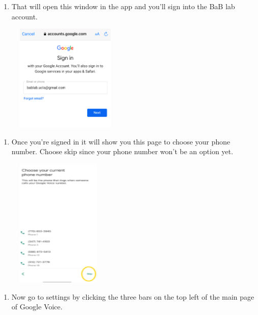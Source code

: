 \documentclass[]{book}
\providecommand{\tightlist}{%
  \setlength{\itemsep}{0pt}\setlength{\parskip}{0pt}}
\begin{document}
\begin{enumerate}
\def\labelenumi{\arabic{enumi})}
\setcounter{enumi}{2}
\tightlist
\item
  That will open this window in the app and you'll sign into the BaB lab
  account.
\end{enumerate}

\begin{figure}
\centering
\includegraphics{images/research_protocols/google_voice/pic3.png}
\caption{}
\end{figure}

\begin{enumerate}
\def\labelenumi{\arabic{enumi})}
\setcounter{enumi}{3}
\tightlist
\item
  Once you're signed in it will show you this page to choose your phone
  number. Choose skip since your phone number won't be an option yet.
\end{enumerate}

\begin{figure}
\centering
\includegraphics{images/research_protocols/google_voice/pic4.png}
\caption{}
\end{figure}

\begin{enumerate}
\def\labelenumi{\arabic{enumi})}
\setcounter{enumi}{4}
\tightlist
\item
  Now go to settings by clicking the three bars on the top left of the
  main page of Google Voice.
\end{enumerate}
\end{document}
